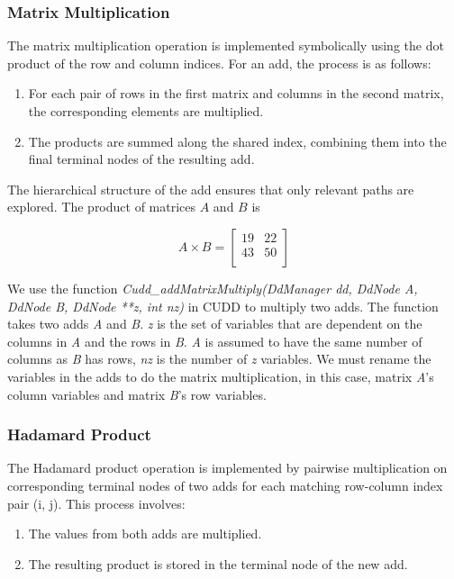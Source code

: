 \subsubsection{Matrix Multiplication}
The matrix multiplication operation is implemented symbolically using the dot product of the row and column indices.
For an \gls{add}, the process is as follows:

\begin{enumerate}
    \item For each pair of rows in the first matrix and columns in the second matrix, the corresponding elements are multiplied.
    \item The products are summed along the shared index, combining them into the final terminal nodes of the resulting \gls{add}.
\end{enumerate}

The hierarchical structure of the \gls{add} ensures that only relevant paths are explored.
The product of matrices $A$ and $B$ is

\[
    A \times B = \begin{bmatrix}
                     19 & 22 \\
                     43 & 50 \\
    \end{bmatrix}
\]

We use the function \textit{Cudd\_addMatrixMultiply(DdManager dd, DdNode A, DdNode B, DdNode **z, int nz)} in CUDD to multiply two \glspl{add}.
The function takes two \glspl{add} \textit{A} and \textit{B}.
\textit{z} is the set of variables that are dependent on the columns in \textit{A} and the rows in \textit{B}.
\textit{A} is assumed to have the same number of columns as \textit{B} has rows, \textit{nz} is the number of \textit{z} variables.
We must rename the variables in the \glspl{add} to do the matrix multiplication, in this case, matrix \textit{A}'s column variables and matrix \textit{B}'s row variables.

\subsubsection{Hadamard Product}\label{subsubsec:hadamard-product}
The Hadamard product operation is implemented by pairwise multiplication on corresponding terminal nodes of two \glspl{add} for each matching row-column index pair (i, j).
This process involves:

\begin{enumerate}
    \item The values from both \glspl{add} are multiplied.
    \item The resulting product is stored in the terminal node of the new \gls{add}.
\end{enumerate}

